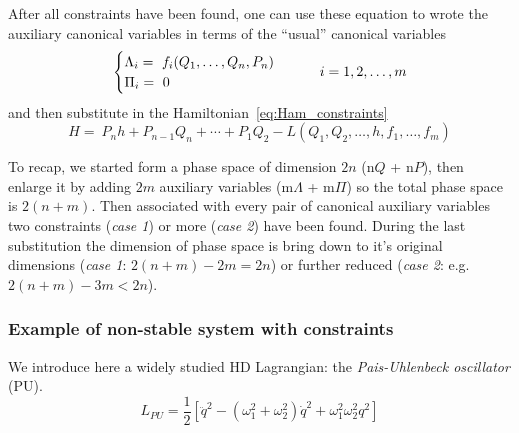 After all constraints have been found, one can use these equation to wrote the
auxiliary canonical variables in terms of the ``usual'' canonical variables
\begin{equation} \label{eq:constraints_in_terms_of_canonical_vars}
  \begin{cases}
    \Lambda_i =\ f_i(Q_1, \ldots, Q_n, P_n) \\
    \Pi_i =\ 0
  \end{cases}
  \qquad i = 1, 2, \ldots, m \\
\end{equation}
and then substitute in the Hamiltonian~\eqref{eq:Ham_constraints}
\begin{equation*}
  H =\ P_n h + P_{n-1} Q_n + \cdots + P_1 Q_2
     - L ( Q_1, Q_2, \ldots, h, f_1, \ldots, f_m)
\end{equation*}

To recap, we started form a phase space of dimension $2n$ (n$Q$ + n$P$),
then enlarge it by adding $2m$ auxiliary variables (m$\Lambda$ + m$\Pi$) so
the total phase space is $2(n+m)$. Then associated with every pair of canonical
auxiliary variables two constraints (\emph{case 1}) or more (\emph{case 2}) have
been found.  During the last substitution the dimension of phase space is bring
down to it's original dimensions (\emph{case 1}: $2(n+m) - 2m = 2n$) or further
reduced (\emph{case 2}: e.g. $2(n+m) - 3m < 2n$).

\subsubsection{Example of non-stable system with constraints}
We introduce here a widely studied HD Lagrangian: the
\emph{Pais-Uhlenbeck oscillator} (PU).
\begin{equation} \label{eq:lagrangian_PU}
  L_{PU} = \frac{1}{2} \left[
    \ddot{q}^2 - (\omega_1^2 + \omega_2^2) \dot{q}^2 + \omega_1^2 \omega_2^2 q^2
  \right]
\end{equation}

